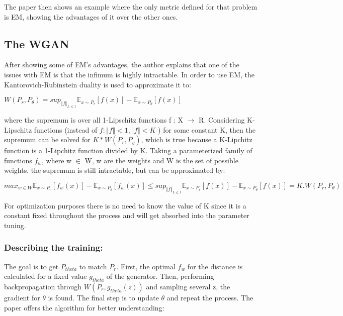 The paper then shows an example where the only metric defined for that problem is EM, showing the advantages of it over the other ones.

\subsection{The WGAN}
After showing some of EM's advantages, the author explains that one of the issues with EM is that the infimum is highly intractable. In order to use EM, the Kantorovich-Rubinstein duality is used to approximate it to:
\begin{center}
	$W(P_{r},P_{\theta}) = sup_{\Vert f \Vert_{L \leq 1}} \mathbb{E}_{x \sim P_{r}}[f(x)] - \mathbb{E}_{x \sim P_{\theta}}[f(x)] $
\end{center}



where the supremum is over all 1-Lipschitz functions f : X $\rightarrow$ R. Considering K-Lipschitz functions (instead of $f : \Vert f \Vert < 1, \Vert f \Vert < K$ ) for some constant K, then the supremum can be solved  for $K*W(P_{r}, P_{g})$, which is true because a K-Lipchitz function is a 1-Lipchitz function divided by K. Taking a parameterized family of  functions $f_{w}$, where w $\in$ W, w are the weights and W is the set of possible weights,  the supremum is still intractable, but can be approximated by:
\begin{center}
	$ max_{w \in W} \mathbb{E}_{x \sim P_{r}}[f_{w}(x)] - \mathbb{E}_{x \sim P_{\theta}}[f_{w}(x)] \leq sup_{\Vert f \Vert_{L \leq 1}} \mathbb{E}_{x \sim P_{r}}[f(x)] - \mathbb{E}_{x \sim P_{\theta}}[f(x)] = K . W(P_{r}, P_{\theta}) $
\end{center}

For optimization purposes there is no need to know the value of K since it is a constant fixed throughout the process and will get absorbed into the parameter tuning.

\subsubsection {Describing the training:}

The goal is to get $P_{theta}$ to match $P_{r}$. First, the optimal $f_{w}$ for the distance is calculated for a fixed value $g_{theta}$ of the generator. Then,  performing  backpropagation through $W(P_{r}, g_{theta}(z))$ and sampling several z, the gradient for $\theta$ is found. The final step is to update $\theta$ and repeat the process. The paper offers the algorithm for better understanding:


